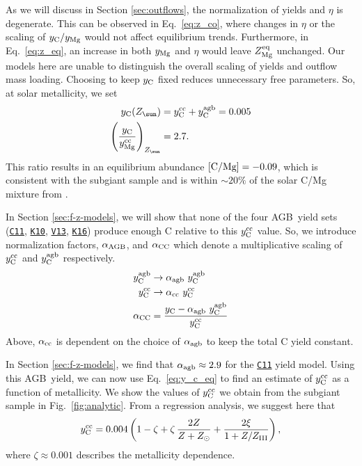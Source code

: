 \documentclass[fleqn,usenatbib]{mnras}
\newcommand{\cxi}{\texttt{\hyperlink{C11}{C11}}}
\newcommand{\kx}{\texttt{\hyperlink{K10}{K10}}}
\newcommand{\kxvi}{\texttt{\hyperlink{K16}{K16}}}
\newcommand{\vxiii}{\texttt{\hyperlink{V13}{V13}}}
\newcommand{\agb}{AGB}
\newcommand{\Yct}{\ensuremath{y_{\rm C}}}
\newcommand{\Ycc}{\ensuremath{y_{\rm C}^{\rm cc}}}
\newcommand{\Yoc}{\ensuremath{y_{\rm Mg}^{\rm cc}}}
\newcommand{\Ycagb}{\ensuremath{y_{\rm C}^{\rm agb}}}
\newcommand{\Zo}{%
    \ifmmode Z_{\sun}%
    \else $Z_{\sun}$%
    \fi}
\newcommand{\about}[1]{${\sim} #1$}
\begin{document}
As we will discuss in Section \ref{sec:outflows}, the normalization of yields and $\eta$ is degenerate. This can be observed in Eq.~\ref{eq:z_co}, where changes in $\eta$ or the scaling of $y_{\rm C}/y_{\rm Mg}$ would not affect equilibrium trends. Furthermore, in Eq.~\ref{eq:z_eq}, an increase in both $y_{\rm Mg}$ and $\eta$ would leave $Z_{\rm Mg}^{\rm eq}$ unchanged. Our models here are unable to distinguish the overall scaling of yields and outflow mass loading. Choosing to keep $y_{\rm C}$ fixed reduces unnecessary free parameters. So, at solar metallicity, we set
\begin{subequations}
    \begin{align}
        \Yct(\Zo) &= \Ycc + \Ycagb = 0.005 \\
        \left(\frac{\Yct}{\Yoc}\right)_{\Zo} &= 2.7.
    \end{align}
\end{subequations}
This ratio results in an equilibrium abundance ${\rm [C/Mg]} = -0.09$, which is consistent with the subgiant sample and is within \about{20\%} of the solar C/Mg mixture from \citet{asplund+09}.

In Section \ref{sec:f-z-models}, we will show that none of the four \agb\ yield sets (\cxi{}, \kx{}, \vxiii{}, \kxvi{}) produce enough C relative to this $\Ycc$ value. So, we introduce normalization factors, $\alpha_{\rm AGB}$, and $\alpha_{\rm CC}$ which denote a multiplicative scaling of $\Ycc$ and $\Ycagb$ respectively. 
\begin{subequations} \label{eq:alpha}
    \begin{align}
        \Ycagb &\rightarrow \alpha_{\rm agb}\ \Ycagb \\
        \Ycc &\rightarrow \alpha_{\rm cc}\ \Ycc\\
        \alpha_{\rm CC} &= \frac{\Yct - \alpha_{\rm agb}\ \Ycagb}{\Ycc}
    \end{align}
\end{subequations}
Above, $\alpha_{\rm cc}$ is dependent on the choice of $\alpha_{\rm agb}$ to keep the total C yield constant. 

In Section \ref{sec:f-z-models}, we find that $\alpha_{\rm agb}\approx 2.9$ for the \cxi{} yield model. Using this \agb\ yield, we can now use Eq.~\ref{eq:y_c_eq} to find an estimate of $\Ycc$ as a function of metallicity. We show the values of $\Ycc$ we obtain from the subgiant sample in Fig.~\ref{fig:analytic}. From a regression analysis, we suggest here that
\begin{equation}\label{eq:zeta}
    \Ycc = 0.004 \left(1 - \zeta + \zeta\,\frac{2Z}{Z + Z_\odot} + \frac{2\xi}{1 + Z/Z_{\rm III}}\right),
\end{equation}
where $\zeta\approx0.001$ describes the metallicity dependence.
\end{document}
